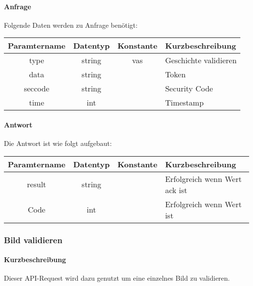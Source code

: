 \paragraph{Anfrage}Folgende Daten werden zu Anfrage benötigt:
\begin{table}[H]
	\begin{tabular}{|c|c|c|p{6.5cm}|}
		\hline
		\textbf{Paramtername} & \textbf{Datentyp} & \textbf{Konstante} & \textbf{Kurzbeschreibung}                                                                                               \\ \hline
		type                & string            & vas                & Geschichte validieren \\ \hline
		data                & string            &                    & Token \\ \hline
		seccode             & string            &                    & Security Code \\ \hline
		time                & int               &                    & Timestamp \\ \hline
	\end{tabular}
\end{table}
\paragraph{Antwort}Die Antwort ist wie folgt aufgebaut:
\begin{table}[H]
	\begin{tabular}{|c|c|c|p{6.5cm}|}
		\hline
		\textbf{Paramtername} & \textbf{Datentyp} & \textbf{Konstante} & \textbf{Kurzbeschreibung}            \\ \hline                
		result              & string           &                 & Erfolgreich wenn Wert {\glqq ack\grqq} ist \\ \hline
		Code                & int              &                 & Erfolgreich wenn Wert {\glqq 0\grqq} ist \\ \hline
	\end{tabular}
\end{table}

\subsubsection{Bild validieren}
\paragraph{Kurzbeschreibung}Dieser API-Request wird dazu genutzt um eine einzelnes Bild zu validieren.
